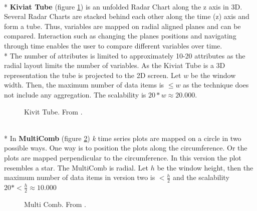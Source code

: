\\*
\textbf{Kiviat Tube} (figure \ref{fig:kiviattube}) is an unfolded Radar Chart along the z axis in 3D. Several Radar Charts are stacked behind each other along the time (z) axis and form a tube. Thus, variables are mapped on radial aligned planes and can be compared. Interaction such as changing the planes positions and navigating through time enables the user to compare different variables over time.\\*
The number of attributes is limited to approximately 10-20 attributes as the radial layout limits the number of variables. As the Kiviat Tube is a 3D representation the tube is projected to the 2D screen. Let $w$ be the window width. Then, the maximum number of data items is $\leq w$ as the technique does not include any aggregation. The scalability is $20*w\approx 20.000$.
\begin{figure}[H]
    \centering
    \caption{Kivit Tube. From  \cite{Aigner2011}.}
    \label{fig:kiviattube}
\end{figure}
\\*
In \textbf{MultiComb} (figure \ref{fig:multicomb}) \textit{k} time series plots are mapped on a circle in two possible ways. One way is to position the plots along the circumference. Or the plots are mapped perpendicular to the circumference. In this version the plot resembles a star.  The MultiComb is radial. Let $h$ be the window height, then the maximum number of data items in version two is $< \frac{h}{2}$ and the scalability $20*< \frac{h}{2} \approx 10.000$
\begin{figure}[H]
    \centering
    \caption{Multi Comb. From  \cite{Luo2012}.}
    \label{fig:multicomb}
\end{figure}
